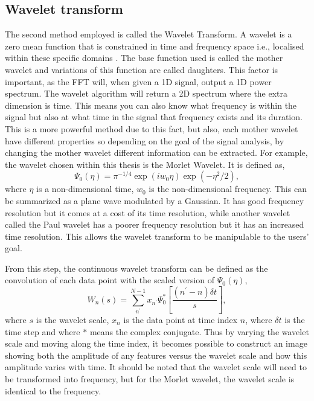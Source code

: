 \subsection{Wavelet transform}

	The second method employed is called the Wavelet Transform.
	A wavelet is a zero mean function that is constrained in time and frequency space i.e., localised within these specific domains \citep{farge1992wavelet}.
	The base function used is called the mother wavelet and variations of this function are called daughters.
	This factor is important, as the FFT will, when given a 1D signal, output a 1D power spectrum.
	The wavelet algorithm will return a 2D spectrum where the extra dimension is time.
	This means you can also know what frequency is within the signal but also at what time in the signal that frequency exists and its duration.
	This is a more powerful method due to this fact, but also, each mother wavelet have different properties so depending on the goal of the signal analysis, by changing the mother wavelet different information can be extracted. 
	For example, the wavelet chosen within this thesis is the Morlet Wavelet.
	It is defined as,
	\begin{equation}
		\Psi_0(\eta) = \pi^{-1/4} \exp(iw_0\eta)\exp(-\eta^2/2),
	\end{equation}
    where $\eta$ is a non-dimensional time, $w_0$ is the non-dimensional frequency.
    This can be summarized as a plane wave modulated by a Gaussian.
	It has good frequency resolution but it comes at a cost of its time resolution, while another wavelet called the Paul wavelet has a poorer frequency resolution but it has an increased time resolution.
	This allows the wavelet transform to be manipulable to the users' goal.
    
    From this step, the continuous wavelet transform can be defined as the convolution of each data point with the scaled version of $\Psi_0(\eta)$,
	\begin{equation}
		W_n (s) = \sum_{n^\prime}^{N-1} x_{n^\prime}\Psi_{0}^{*} \left[\frac{(n^\prime-n)\delta t}{s}\right],
	\end{equation}
    where $s$ is the wavelet scale, $x_n$ is the data point at time index $n$, where $\delta t$ is the time step and where $*$ means the complex conjugate. 
    Thus by varying the wavelet scale and moving along the time index, it becomes possible to construct an image showing both the amplitude of any features versus the wavelet scale and how this amplitude varies with time. 
    It should be noted that the wavelet scale will need to be transformed into frequency, but for the Morlet wavelet, the wavelet scale is identical to the frequency.
    
